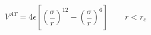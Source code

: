 


$$
 V^{AT} = 4 \epsilon \left[ \left(\frac{\sigma}{r}\right)^{12} - 
                       \left(\frac{\sigma}{r}\right)^6 \right]
                       \qquad r < r_c
$$


